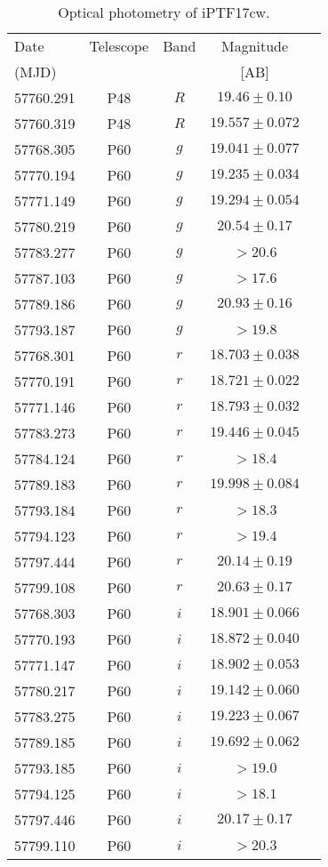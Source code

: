 \documentclass[twocolumn]{emulateapj}
\begin{document}


\newpage

\begin{center}
\begin{longtable}{lcccc}
\caption{Optical photometry of iPTF17cw. \label{phot_tab}}
\\
\hline
\hline
Date & Telescope & Band & Magnitude \\
(MJD) & &  & [AB]\\ 
\hline
\endhead
\hline
57760.291& P48 & $R$ & $19.46\pm0.10$\\
57760.319 & P48 & $R$ &  $19.557\pm0.072$\\
\hline
57768.305 & P60 & $g$ & $19.041\pm 0.077$\\
57770.194 & P60 & $g$ & $19.235\pm0.034$\\
57771.149 & P60 & $g$ & $19.294\pm0.054$\\
57780.219 & P60 & $g$ & $20.54\pm0.17$\\
57783.277 & P60 & $g$ &  $>20.6$\\
57787.103 & P60 & $g$ &   $>17.6$\\
57789.186 & P60 & $g$ & $20.93\pm0.16$\\
57793.187 & P60 & $g$ &   $>19.8$\\
\hline
57768.301 & P60 & $r$ & $18.703 \pm 0.038$ \\
57770.191 & P60 & $r$ & $18.721 \pm 0.022$ \\
57771.146 & P60 & $r$ & $18.793\pm  0.032$\\
57783.273 & P60 & $r$ & $19.446\pm 0.045$\\
57784.124 & P60 & $r$ & $>18.4$ \\
57789.183 & P60 & $r$ & $19.998 \pm 0.084$\\
57793.184 & P60 & $r$ & $>18.3$\\
57794.123 & P60 & $r$ &$>19.4$\\
57797.444 & P60 & $r$ & $20.14 \pm 0.19$\\
57799.108 & P60 & $r$ & $20.63\pm 0.17$\\
\hline
57768.303 & P60 & $i$ & $18.901\pm 0.066$\\
57770.193 & P60 & $i$ & $18.872\pm 0.040$\\
57771.147 & P60 & $i$ & $18.902\pm 0.053$\\
57780.217 & P60 & $i$ & $19.142\pm 0.060$\\
57783.275 & P60 & $i$ & $19.223\pm 0.067$\\
57789.185 & P60 & $i$ & $19.692\pm 0.062$\\
57793.185 & P60 & $i$ & $>19.0$\\
57794.125 & P60 & $i$ & $>18.1$\\
57797.446 & P60 & $i$ & $20.17 \pm 0.17$\\
57799.110& P60 & $i$ &  $>20.3$\\
\hline
\end{longtable}
\end{center}
\end{document}
